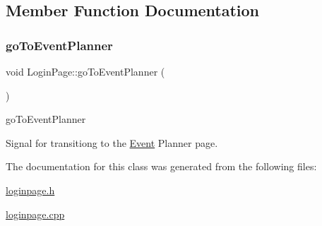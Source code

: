 \subsection{Member Function Documentation}
\mbox{\label{class_login_page_a7b74b87a3affb709ea585fb556a57271}} 
\subsubsection{\texorpdfstring{go\+To\+Event\+Planner}{goToEventPlanner}}
{\footnotesize\ttfamily void Login\+Page\+::go\+To\+Event\+Planner (\begin{DoxyParamCaption}{ }\end{DoxyParamCaption})\hspace{0.3cm}{\ttfamily [signal]}}



go\+To\+Event\+Planner 

Signal for transitiong to the \hyperlink{class_event}{Event} Planner page. 

The documentation for this class was generated from the following files\+:\begin{DoxyCompactItemize}
\item 
\hyperlink{loginpage_8h}{loginpage.\+h}\item 
\hyperlink{loginpage_8cpp}{loginpage.\+cpp}\end{DoxyCompactItemize}
